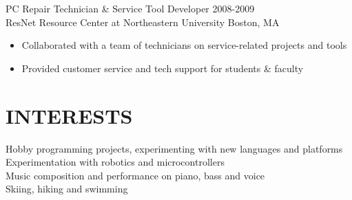 \documentclass[line,margin]{res}
\begin{document}
\begin{resume}
                {\large PC Repair Technician \& Service Tool Developer}
                \hfill 2008-2009 \\
                ResNet Resource Center at Northeastern University \hfill Boston, MA
                 \begin{itemize}  \itemsep -2pt %
                 \item Collaborated with a team of technicians on service-related projects and tools
                 \item Provided customer service and tech support for students \& faculty
                \end{itemize}

\section{INTERESTS}
                Hobby programming projects, experimenting with new languages and platforms \\
                Experimentation with robotics and microcontrollers \\
                Music composition and performance on piano, bass and voice \\
                Skiing, hiking and swimming

\end{resume}
\end{document}
